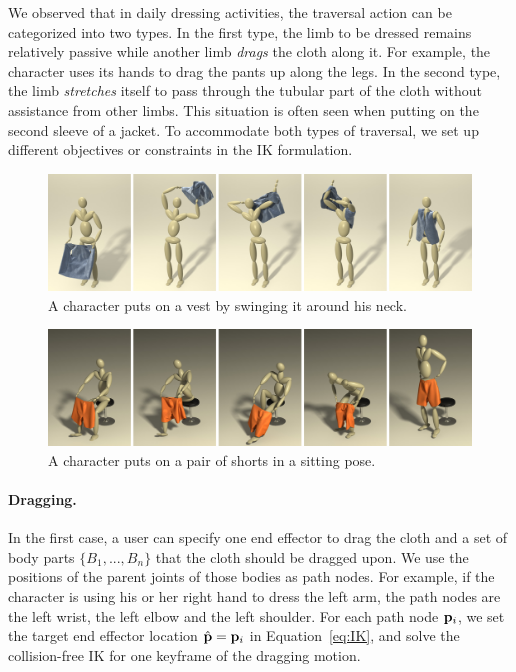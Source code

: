 We observed that in daily dressing activities, the traversal action can be categorized into two types. In the first type, the limb to be dressed remains relatively passive while another limb \emph{drags} the cloth along it. For example, the character uses its hands to drag the pants up along the legs. In the second type, the limb \emph{stretches} itself to pass through the tubular part of the cloth without assistance from other limbs. This situation is often seen when putting on the second sleeve of a jacket. To accommodate both types of traversal, we set up different objectives or constraints in the IK formulation.


\begin{figure}[!t]
  \centering
  \includegraphics[width=\textwidth]{images/vest}
  \caption{A character puts on a vest by swinging it around his neck.}
  \label{fig:vest}
\end{figure}

\begin{figure}[!t]
  \centering
  \includegraphics[width=\textwidth]{images/shortsSitting}
  \caption{A character puts on a pair of shorts in a sitting pose.}
  \label{fig:shorts1}
\end{figure}



\paragraph{Dragging.} In the first case, a user can specify one end effector to drag the cloth and a set of body parts $\{B_1 ,..., B_n\}$ that the cloth should be dragged upon. We use the positions of the parent joints of those bodies as path nodes. For example, if the character is using his or her right hand to dress the left arm, the path nodes are the left wrist, the left elbow and the left shoulder. For each path node $\mathbf{p}_i$, we set the target end effector location $\hat{\mathbf{p}}=\mathbf{p}_i$ in Equation~\ref{eq:IK}, and solve the collision-free IK for one keyframe of the dragging motion.

